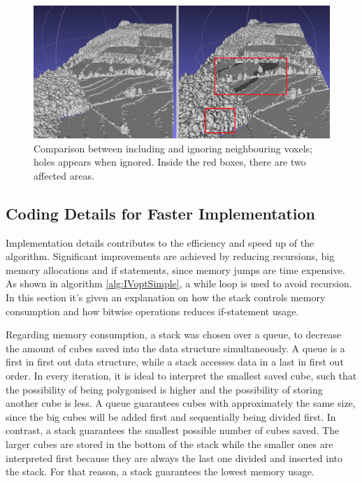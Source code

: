 \documentclass{subfiles}
\begin{document}
\begin{figure}[!htbp]
	\centering
	\includegraphics[width=5.5in]{img/HolesNeighbours}
	\caption{Comparison between including and ignoring neighbouring voxels; holes appears when ignored. {\color{blue} Inside the red boxes, there are two affected areas.}}
	\label{fig:IVholesNeighbours}
\end{figure}

\subsection{Coding Details for Faster Implementation}\label{sec:IVcodeDetails}
Implementation details contributes to the efficiency and speed up of the algorithm. Significant improvements are achieved by reducing recursions, big memory allocations and if statements, since memory jumps are time expensive. As shown in algorithm \ref{alg:IVoptSimple}, a while loop is used to avoid recursion. In this section it's given an explanation on how the stack controls memory consumption and how bitwise operations reduces if-statement usage. 

Regarding memory consumption, a stack was chosen over a queue, to decrease the amount of cubes saved into the data structure simultaneously. A queue is a first in first out data structure, while a stack accesses data in a last in first out order. In every iteration, it is ideal to interpret the smallest saved cube, such that the possibility of being polygonised is higher and the possibility of storing another cube is less. A queue guarantees cubes with approximately the same size, since the big cubes will be added first and sequentially being divided first. In contrast, a stack guarantees the smallest possible number of cubes saved. The larger cubes are stored in the bottom of the stack while the smaller ones are interpreted first because they are always the last one divided and inserted into the stack.  For that reason, a stack guarantees the lowest memory usage. 
\end{document}
